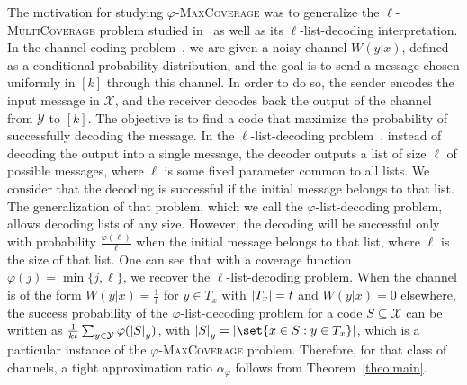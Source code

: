 The motivation for studying $\varphi$-\textsc{MaxCoverage} was to generalize the $\ell$-\textsc{MultiCoverage} problem studied in~\cite{BFGG20} as well as its $\ell$-list-decoding interpretation. In the channel coding problem~\cite{BF18}, we are given a noisy channel $W(y|x)$, defined as a conditional probability distribution, and the goal is to send a message chosen uniformly in $[k]$ through this channel. In order to do so, the sender encodes the input message in $\mathcal{X}$, and the receiver decodes back the output of the channel from $\mathcal{Y}$ to $[k]$. The objective is to find a code that maximize the probability of successfully decoding the message. In the $\ell$-list-decoding problem~\cite{Elias57,Wozencraft58}, instead of decoding the output into a single message, the decoder outputs a list of size $\ell$ of possible messages, where $\ell$ is some fixed parameter common to all lists. We consider that the decoding is successful if the initial message belongs to that list. The generalization of that problem, which we call the $\varphi$-list-decoding problem, allows decoding lists of any size.  However, the decoding will be successful only with probability $\frac{\varphi(\ell)}{\ell}$ when the initial message belongs to that list, where $\ell$ is the size of that list. One can see that with a coverage function $\varphi(j) = \min\{ j,\ell\}$, we recover the $\ell$-list-decoding problem. When the channel is of the form $W(y|x) = \frac{1}{t}$ for $y \in T_x$ with $\abs{T_x}=t$ and $W(y|x) = 0$ elsewhere, the success probability of the $\varphi$-list-decoding problem for a code $S\subseteq \mathcal{X}$ can be written as $\frac{1}{kt}\sum_{y \in \mathcal{Y}}\varphi(\abs{S}_y)$, with $\abs{S}_y = \abs{\set{x \in S : y \in T_x}}$, which is a particular instance of the $\varphi$-\textsc{MaxCoverage} problem. Therefore, for that class of channels, a tight approximation ratio $\alpha_{\varphi}$ follows from Theorem~\ref{theo:main}.

